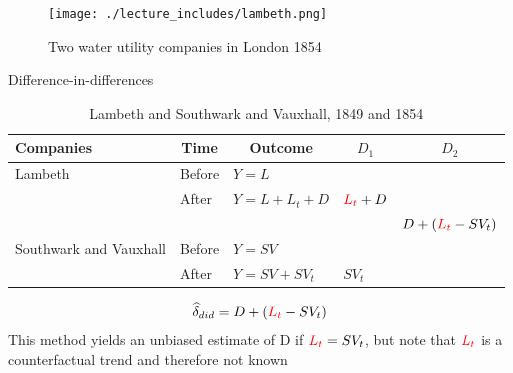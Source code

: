 \documentclass{beamer}
\begin{document}
\begin{frame}

	\begin{figure}
	\caption{Two water utility companies in London 1854}
	\texttt{[image: ./lecture\_includes/lambeth.png]}
	\end{figure}


\end{frame}



\begin{frame}{Difference-in-differences}

\begin{table}\centering
\scriptsize
		\caption{Lambeth and Southwark and Vauxhall, 1849 and 1854}
		\begin{center}
		\begin{tabular}{lll|lc}
		\toprule
		\multicolumn{1}{l}{\textbf{Companies}}&
		\multicolumn{1}{c}{\textbf{Time}}&
		\multicolumn{1}{c}{\textbf{Outcome}}&
		\multicolumn{1}{c}{$D_1$}&
		\multicolumn{1}{c}{$D_2$}\\
		\midrule
		Lambeth & Before & $Y=L$ \\
		& After & $Y=L + L_t + D$ & $\textcolor{red}{L_t}+D$\\
		\midrule
		& & & & $D + (\textcolor{red}{L_t}- SV_t)$ \\
		\midrule
		Southwark and Vauxhall & Before & $Y=SV$ \\
		& After & $Y=SV + SV_t$ & $SV_t$\\
		\bottomrule
		\end{tabular}
		\end{center}
	\end{table}

\begin{eqnarray*}
\widehat{\delta}_{did} = D + (\textcolor{red}{L_t}- SV_t)
\end{eqnarray*}This method yields an unbiased estimate of D if $\textcolor{red}{L_t} = SV_t$, but note that $\textcolor{red}{L_t}$ is a counterfactual trend and therefore not known

\end{frame}
\end{document}
